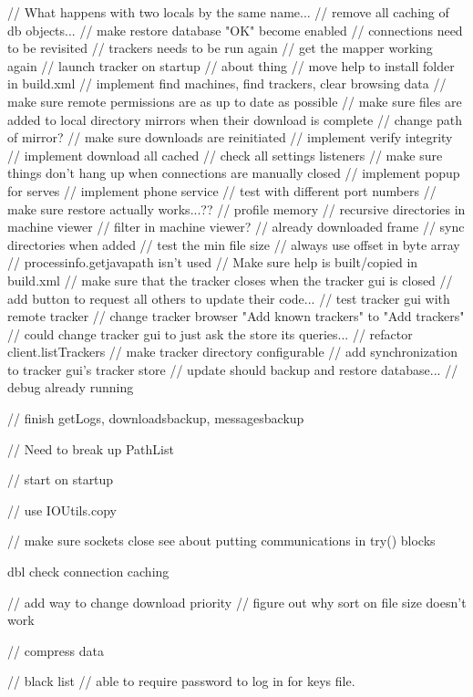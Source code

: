 \documentclass{article}
\begin{document}
// What happens with two locals by the same name...
// remove all caching of db objects...
// make restore database "OK" become enabled
// connections need to be revisited
// trackers needs to be run again
// get the mapper working again
// launch tracker on startup
// about thing
// move help to install folder in build.xml
// implement find machines, find trackers, clear browsing data
// make sure remote permissions are as up to date as possible
// make sure files are added to local directory mirrors when their download is complete
// change path of mirror?
// make sure downloads are reinitiated
// implement verify integrity
// implement download all cached
// check all settings listeners
// make sure things don't hang up when connections are manually closed
// implement popup for serves
// implement phone service
// test with different port numbers
// make sure restore actually works...??
// profile memory
// recursive directories in machine viewer
// filter in machine viewer?
// already downloaded frame
// sync directories when added
// test the min file size
// always use offset in byte array
// processinfo.getjavapath isn't used
// Make sure help is built/copied in build.xml
// make sure that the tracker closes when the tracker gui is closed
// add button to request all others to update their code...
// test tracker gui with remote tracker
// change tracker browser "Add known trackers" to "Add trackers"
// could change tracker gui to just ask the store its queries...
// refactor client.listTrackers
// make tracker directory configurable
// add synchronization to tracker gui's tracker store
// update should backup and restore database...
// debug already running

// finish getLogs, downloadsbackup, messagesbackup


        // Need to break up PathList

        // start on startup
        
		// use IOUtils.copy
        
        // make sure sockets close
 see about putting communications in try() {} blocks
 
dbl check connection caching
 
        // add way to change download priority
        // figure out why sort on file size doesn't work
        
        // compress data
        
        // black list
        // able to require password to log in for keys file.
        
\end{document}
